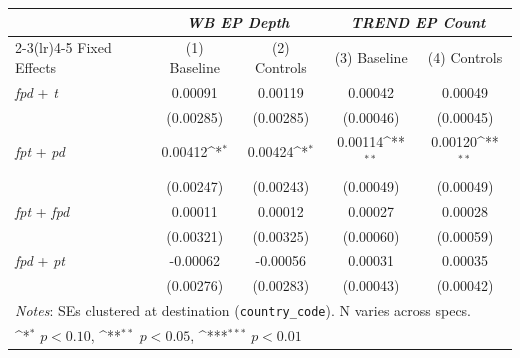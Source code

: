{
\def\sym#1{\ifmmode^{#1}\else\(^{#1}\)\fi}
\begin{tabular}{lcccc}
\toprule
 & \multicolumn{2}{c}{\textit{WB EP Depth}} & \multicolumn{2}{c}{\textit{TREND EP Count}} \\
\cmidrule(lr){2-3}\cmidrule(lr){4-5}
Fixed Effects & (1) Baseline & (2) Controls & (3) Baseline & (4) Controls \\
\midrule
\textit{fpd} + \textit{t} & 0.00091 & 0.00119 & 0.00042 & 0.00049 \\
 & (0.00285) & (0.00285) & (0.00046) & (0.00045) \\
\addlinespace
\textit{fpt} + \textit{pd} & 0.00412\sym{*} & 0.00424\sym{*} & 0.00114\sym{**} & 0.00120\sym{**} \\
 & (0.00247) & (0.00243) & (0.00049) & (0.00049) \\
\addlinespace
\textit{fpt} + \textit{fpd} & 0.00011 & 0.00012 & 0.00027 & 0.00028 \\
 & (0.00321) & (0.00325) & (0.00060) & (0.00059) \\
\addlinespace
\textit{fpd} + \textit{pt} & -0.00062 & -0.00056 & 0.00031 & 0.00035 \\
 & (0.00276) & (0.00283) & (0.00043) & (0.00042) \\
\midrule
\multicolumn{5}{l}{\footnotesize \textit{Notes}: SEs clustered at destination (\texttt{country\_code}). N varies across specs.} \\
\multicolumn{5}{l}{\footnotesize \sym{*} \(p<0.10\), \sym{**} \(p<0.05\), \sym{***} \(p<0.01\)} \\
\bottomrule
\end{tabular}
}
